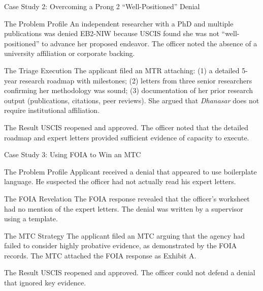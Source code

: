 \documentclass[11pt]{beamer}
\begin{document}
	\begin{frame}{Case Study 2: Overcoming a Prong 2 ``Well-Positioned'' Denial}
		\scriptsize
		\begin{block}{The Problem Profile}
			An independent researcher with a PhD and multiple publications was denied EB2-NIW because USCIS found she was not ``well-positioned'' to advance her proposed endeavor. The officer noted the absence of a university affiliation or corporate backing.
		\end{block}
		\begin{block}{The Triage Execution}
			The applicant filed an MTR attaching: (1) a detailed 5-year research roadmap with milestones; (2) letters from three senior researchers confirming her methodology was sound; (3) documentation of her prior research output (publications, citations, peer reviews). She argued that \textit{Dhanasar} does not require institutional affiliation.
		\end{block}
		\begin{block}{The Result}
			USCIS reopened and approved. The officer noted that the detailed roadmap and expert letters provided sufficient evidence of capacity to execute.
		\end{block}
	\end{frame}
	
	\begin{frame}{Case Study 3: Using FOIA to Win an MTC}
		\scriptsize
		\begin{block}{The Problem Profile}
			Applicant received a denial that appeared to use boilerplate language. He suspected the officer had not actually read his expert letters.
		\end{block}
		\begin{block}{The FOIA Revelation}
			The FOIA response revealed that the officer's worksheet had no mention of the expert letters. The denial was written by a supervisor using a template.
		\end{block}
		\begin{block}{The MTC Strategy}
			The applicant filed an MTC arguing that the agency had failed to consider highly probative evidence, as demonstrated by the FOIA records. The MTC attached the FOIA response as Exhibit A.
		\end{block}
		\begin{block}{The Result}
			USCIS reopened and approved. The officer could not defend a denial that ignored key evidence.
		\end{block}
	\end{frame}
	
\end{document}
